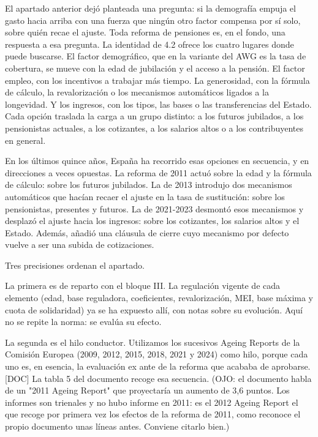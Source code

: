 \documentclass[10pt,a4paper]{article}
\begin{document}
El apartado anterior dejó planteada una pregunta: si la demografía empuja el gasto hacia arriba con una fuerza que ningún otro factor compensa por sí solo, sobre quién recae el ajuste. Toda reforma de pensiones es, en el fondo, una respuesta a esa pregunta. La identidad de 4.2 ofrece los cuatro lugares donde puede buscarse. El factor demográfico, que en la variante del AWG es la tasa de cobertura, se mueve con la edad de jubilación y el acceso a la pensión. El factor empleo, con los incentivos a trabajar más tiempo. La generosidad, con la fórmula de cálculo, la revalorización o los mecanismos automáticos ligados a la longevidad. Y los ingresos, con los tipos, las bases o las transferencias del Estado. Cada opción traslada la carga a un grupo distinto: a los futuros jubilados, a los pensionistas actuales, a los cotizantes, a los salarios altos o a los contribuyentes en general.

En los últimos quince años, España ha recorrido esas opciones en secuencia, y en direcciones a veces opuestas. La reforma de 2011 actuó sobre la edad y la fórmula de cálculo: sobre los futuros jubilados. La de 2013 introdujo dos mecanismos automáticos que hacían recaer el ajuste en la tasa de sustitución: sobre los pensionistas, presentes y futuros. La de 2021-2023 desmontó esos mecanismos y desplazó el ajuste hacia los ingresos: sobre los cotizantes, los salarios altos y el Estado. Además, añadió una cláusula de cierre cuyo mecanismo por defecto vuelve a ser una subida de cotizaciones.

Tres precisiones ordenan el apartado.

La primera es de reparto con el bloque III. La regulación vigente de cada elemento (edad, base reguladora, coeficientes, revalorización, MEI, base máxima y cuota de solidaridad) ya se ha expuesto allí, con notas sobre su evolución. Aquí no se repite la norma: se evalúa su efecto.

La segunda es el hilo conductor. Utilizamos los sucesivos Ageing Reports de la Comisión Europea (2009, 2012, 2015, 2018, 2021 y 2024) como hilo, porque cada uno es, en esencia, la evaluación ex ante de la reforma que acababa de aprobarse. [DOC] La tabla 5 del documento recoge esa secuencia. (OJO: el documento habla de un "2011 Ageing Report" que proyectaría un aumento de 3,6 puntos. Los informes son trienales y no hubo informe en 2011: es el 2012 Ageing Report el que recoge por primera vez los efectos de la reforma de 2011, como reconoce el propio documento unas líneas antes. Conviene citarlo bien.)
\end{document}
